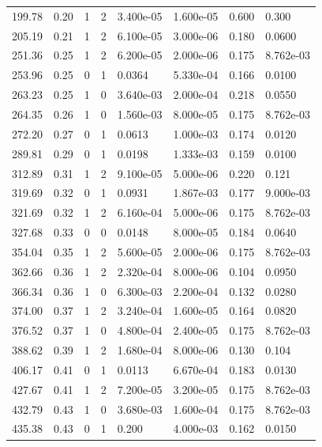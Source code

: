 \documentclass[preview]{standalone}
\begin{document}
{{\begin{tabular}{L{1.2cm}C{1.2cm} C{0.3cm}C{0.5cm} C{1.4cm}C{1.4cm} C{1.4cm}C{1.4cm}}
  199.78  &  0.20  & 1     &  2 &  3.400e-05  & 1.600e-05  & 0.600 &  0.300   \\ 
  205.19  &  0.21  & 1     &  2 &  6.100e-05  & 3.000e-06  & 0.180 &  0.0600   \\ 
  251.36  &  0.25  & 1     &  2 &  6.200e-05  & 2.000e-06  & 0.175 &  8.762e-03   \\ 
  253.96  &  0.25  & 0     &  1 &  0.0364  & 5.330e-04  & 0.166 &  0.0100   \\ 
  263.23  &  0.25  & 1     &  0 &  3.640e-03  & 2.000e-04  & 0.218 &  0.0550   \\ 
  264.35  &  0.26  & 1     &  0 &  1.560e-03  & 8.000e-05  & 0.175 &  8.762e-03   \\ 
  272.20  &  0.27  & 0     &  1 &  0.0613  & 1.000e-03  & 0.174 &  0.0120   \\ 
  289.81  &  0.29  & 0     &  1 &  0.0198  & 1.333e-03  & 0.159 &  0.0100   \\ 
  312.89  &  0.31  & 1     &  2 &  9.100e-05  & 5.000e-06  & 0.220 &  0.121   \\ 
  319.69  &  0.32  & 0     &  1 &  0.0931  & 1.867e-03  & 0.177 &  9.000e-03   \\ 
  321.69  &  0.32  & 1     &  2 &  6.160e-04  & 5.000e-06  & 0.175 &  8.762e-03   \\ 
  327.68  &  0.33  & 0     &  0 &  0.0148  & 8.000e-05  & 0.184 &  0.0640   \\ 
  354.04  &  0.35  & 1     &  2 &  5.600e-05  & 2.000e-06  & 0.175 &  8.762e-03   \\ 
  362.66  &  0.36  & 1     &  2 &  2.320e-04  & 8.000e-06  & 0.104 &  0.0950   \\ 
  366.34  &  0.36  & 1     &  0 &  6.300e-03  & 2.200e-04  & 0.132 &  0.0280   \\ 
  374.00  &  0.37  & 1     &  2 &  3.240e-04  & 1.600e-05  & 0.164 &  0.0820   \\ 
  376.52  &  0.37  & 1     &  0 &  4.800e-04  & 2.400e-05  & 0.175 &  8.762e-03   \\ 
  388.62  &  0.39  & 1     &  2 &  1.680e-04  & 8.000e-06  & 0.130 &  0.104   \\ 
  406.17  &  0.41  & 0     &  1 &  0.0113  & 6.670e-04  & 0.183 &  0.0130   \\ 
  427.67  &  0.41  & 1     &  2 &  7.200e-05  & 3.200e-05  & 0.175 &  8.762e-03   \\ 
  432.79  &  0.43  & 1     &  0 &  3.680e-03  & 1.600e-04  & 0.175 &  8.762e-03   \\ 
  435.38  &  0.43  & 0     &  1 &  0.200  & 4.000e-03  & 0.162 &  0.0150   \\ 

\end{tabular}}}
\end{document}
